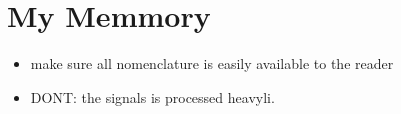 \chapter{My Memmory}

\begin{itemize}
    \item make sure all nomenclature is easily available to the reader
    \item DONT: the signals is processed heavyli. 
\end{itemize}